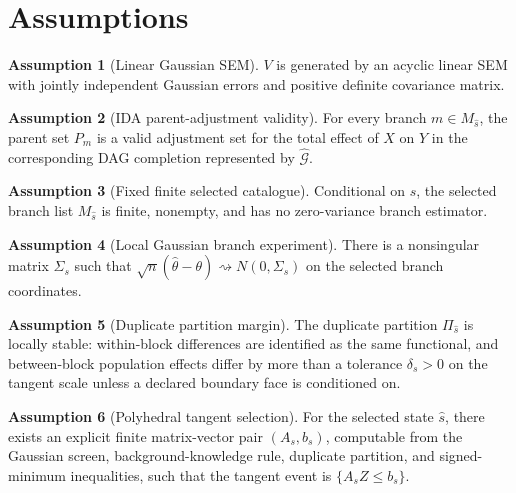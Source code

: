 \documentclass[11pt]{article}
\theoremstyle{definition}
\newtheorem{assumption}{Assumption}
\theoremstyle{plain}
\theoremstyle{remark}
\begin{document}
\section{Assumptions}
\begin{assumption}[Linear Gaussian SEM]\label{ass:linear-gaussian}
$V$ is generated by an acyclic linear SEM with jointly independent Gaussian errors and positive definite covariance matrix.
\end{assumption}

\begin{assumption}[IDA parent-adjustment validity]\label{ass:ida-valid}
For every branch $m\in M_{\widehat s}$, the parent set $P_m$ is a valid adjustment set for the total effect of $X$ on $Y$ in the corresponding DAG completion represented by $\widehat{\mathcal G}$.
\end{assumption}

\begin{assumption}[Fixed finite selected catalogue]\label{ass:finite-catalogue}
Conditional on $\widehat s$, the selected branch list $M_{\widehat s}$ is finite, nonempty, and has no zero-variance branch estimator.
\end{assumption}

\begin{assumption}[Local Gaussian branch experiment]\label{ass:local-gaussian}
There is a nonsingular matrix $\Sigma_s$ such that $\sqrt n(\widehat\theta-\theta)\rightsquigarrow N(0,\Sigma_s)$ on the selected branch coordinates.
\end{assumption}

\begin{assumption}[Duplicate partition margin]\label{ass:duplicate-margin}
The duplicate partition $\Pi_{\widehat s}$ is locally stable: within-block differences are identified as the same functional, and between-block population effects differ by more than a tolerance $\delta_s>0$ on the tangent scale unless a declared boundary face is conditioned on.
\end{assumption}

\begin{assumption}[Polyhedral tangent selection]\label{ass:polyhedral-tangent}
For the selected state $\widehat s$, there exists an explicit finite matrix-vector pair $(A_s,b_s)$, computable from the Gaussian screen, background-knowledge rule, duplicate partition, and signed-minimum inequalities, such that the tangent event is $\{A_s Z\le b_s\}$.
\end{assumption}
\end{document}
